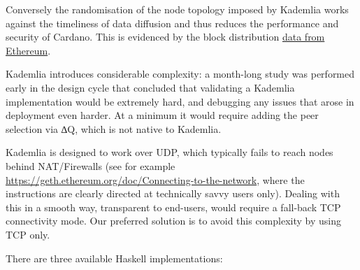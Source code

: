 \documentclass[11pt,a4paper]{article}
\begin{document}
Conversely the randomisation of the node topology imposed by Kademlia
works against the timeliness of data diffusion and thus reduces the
performance and security of Cardano. This is evidenced by the block
distribution \protect\hyperlink{ethereum}{{data from Ethereum}}.

Kademlia introduces considerable complexity: a month-long study was
performed early in the design cycle that concluded that validating a
Kademlia implementation would be extremely hard, and debugging any
issues that arose in deployment even harder. At a minimum it would
require adding the peer selection via ∆Q, which is not native to
Kademlia.

Kademlia is designed to work over UDP, which typically fails to reach
nodes behind NAT/Firewalls (see for example
\href{https://geth.ethereum.org/doc/Connecting-to-the-network}{{https://geth.ethereum.org/doc/Connecting-to-the-network}},
where the instructions are clearly directed at technically savvy users
only). Dealing with this in a smooth way, transparent to end-users,
would require a fall-back TCP connectivity mode. Our preferred solution
is to avoid this complexity by using TCP only.

There are three available Haskell implementations:
\end{document}
